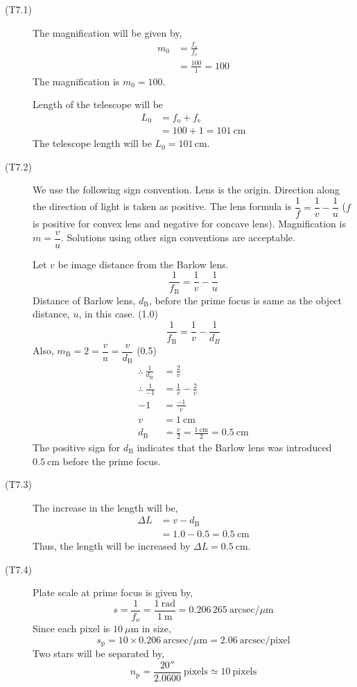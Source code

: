 \begin{description}
\item[(T7.1)] The magnification will be given by,
\begin{align*}
m_0 &= \frac{f_{\mathrm{o}}}{f_{\mathrm{e}}} \tag*{(1.0)}\\
&= \frac{100}{1} = 100 \tag*{(1.0)}
\end{align*}
The magnification is $m_0 = 100$.

Length of the telescope will be
\begin{align*}
L_0 &= f_{\mathrm{o}} + f_{\mathrm{e}} \tag*{(1.0)}\\
&= 100 + 1 = 101\ \mathrm{cm} \tag*{(1.0)}
\end{align*}
The telescope length will be $L_0 = 101$\,cm.

\item[(T7.2)] We use the following sign convention. Lens is the origin.
Direction along the direction of light is taken as positive. The lens formula
is $\dfrac{1}{f} = \dfrac{1}{v} - \dfrac{1}{u}$ ($f$ is positive for convex
lens and negative for concave lens). Magnification is $m = \dfrac{v}{u}$.
Solutions using other sign conventions are acceptable.

Let $v$ be image distance from the Barlow lens.
\[
\frac{1}{f_{\mathrm{B}}} = \frac{1}{v} - \frac{1}{u} \tag*{(1.0)}
\]
Distance of Barlow lens, $d_{\mathrm{B}}$, before the prime focus is same as
the object distance, $u$, in this case. \hfill(1.0)
\[
\frac{1}{f_{\mathrm{B}}} = \frac{1}{v} - \frac{1}{d_B}
\]
Also, $m_{\mathrm{B}} = 2 = \dfrac{v}{u} = \dfrac{v}{d_{\mathrm{B}}}$
\hfill(0.5)
\begin{align*}
\therefore\ \frac{1}{d_{\mathrm{B}}} &= \frac{2}{v} \tag*{(1.0)}\\
\therefore\ \frac{1}{-1} &= \frac{1}{v} - \frac{2}{v}\\
-1 &= \frac{-1}{v}\\
v &= 1\ \mathrm{cm}\\
d_{\mathrm{B}} &= \frac{v}{2} = \frac{1\ \mathrm{cm}}{2} = 0.5\ \mathrm{cm}
  \tag*{(2.5)}
\end{align*}
The positive sign for $d_{\mathrm{B}}$ indicates that the Barlow lens was
introduced $\boxed{0.5\ \mathrm{cm}}$ before the prime focus.

\item[(T7.3)] The increase in the length will be,
\begin{align*}
\Delta L &= v - d_{\mathrm{B}} \tag*{(2.0)}\\
&= 1.0 - 0.5 = 0.5\ \mathrm{cm} \tag*{(2.0)}
\end{align*}
Thus, the length will be increased by $\boxed{\Delta L = 0.5\ \mathrm{cm}}$.

\item[(T7.4)] Plate scale at prime focus is given by,
\[
s = \frac{1}{f_o} = \frac{1\ \mathrm{rad}}{1\ \mathrm{m}}
 = 0.206\,265\ \mathrm{arcsec}/\mu\mathrm{m} \tag*{(2.0)}
\]
Since each pixel is $10\ \mu$m in size,
\[
s_{\mathrm{p}} = 10 \times 0.206\ \mathrm{arcsec}/\mu\mathrm{m}
 = 2.06\ \mathrm{arcsec/pixel} \tag*{(2.0)}
\]
Two stars will be separated by,
\[
n_{\mathrm{p}} = \frac{20''}{2.0600}\ \mathrm{pixels}
 \simeq 10\ \mathrm{pixels} \tag*{(2.0)}
\]
\end{description}
